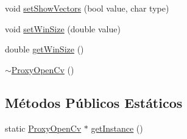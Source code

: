\begin{DoxyCompactItemize}
\item 
void \hyperlink{classmodel_1_1ProxyOpenCv_ae5967707ef78ef4fe796e343c3eee63e}{setShowVectors} (bool value, char type)
\item 
void \hyperlink{classmodel_1_1ProxyOpenCv_ae111c53cdb0af965ec4d96c184ec4b32}{setWinSize} (double value)
\item 
double \hyperlink{classmodel_1_1ProxyOpenCv_af7517ba69ad9369d26f7b9734dbd253c}{getWinSize} ()
\item 
\hyperlink{classmodel_1_1ProxyOpenCv_acde2340f5d07840e510ca29686b8b0f3}{$\sim$ProxyOpenCv} ()
\end{DoxyCompactItemize}
\subsection*{Métodos Públicos Estáticos}
\begin{DoxyCompactItemize}
\item 
static \hyperlink{classmodel_1_1ProxyOpenCv}{ProxyOpenCv} $\ast$ \hyperlink{classmodel_1_1ProxyOpenCv_a46f691272d93877cadfae4ec22dffde8}{getInstance} ()
\end{DoxyCompactItemize}
